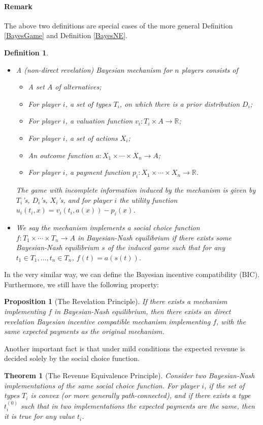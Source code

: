 \documentclass[openany]{book}
\newtheorem{definition}{Definition}[chapter]
\newtheorem{theorem}{Theorem}[chapter]
\newtheorem{proposition}{Proposition}[chapter]
\theoremstyle{remark}
\begin{document}
\paragraph{Remark}
The above two definitions are special cases of the more general Definition \ref{BayesGame} and Definition \ref{BayesNE}.
\begin{definition}$\ $
    \begin{itemize}
        \item A (non-direct revelation) Bayesian mechanism for $n$ players consists of
        \begin{itemize}
            \item A set $A$ of alternatives;
            \item For player $i$, a set of types $T_i$, on which there is a prior distribution $D_i$;
            \item For player $i$, a valuation function $v_i:T_i\times A\to \mathbb{R}$;
            \item For player $i$, a set of actions $X_i$;
            \item An outcome function $a:X_1\times\cdots\times X_n\to A$;
            \item For player $i$, a payment function $p_i:X_1\times\cdots\times X_n\to \mathbb{R}$.
        \end{itemize}
        The game with incomplete information induced by the mechanism is given by $T_i$'s, $D_i$'s, $X_i$'s, and for player $i$ the utility function $u_i(t_i,x)=v_i(t_i,a(x))-p_i(x)$.
        \item We say the mechanism implements a social choice function $f:T_1\times\cdots\times T_n\to A$ in Bayesian-Nash equilibrium if there exists some Bayesian-Nash equilibrium $s$ of the induced game such that for any $t_1\in T_1,\ldots,t_n\in T_n$, $f(t)=a(s(t))$.
    \end{itemize}
\end{definition}

In the very similar way, we can define the Bayesian incentive compatibility (BIC). Furthermore, we still have the following property:
\begin{proposition}[The Revelation Principle]
    If there exists a mechanism implementing $f$ in Bayesian-Nash equilibrium, then there exists an direct revelation Bayesian incentive compatible mechanism implementing $f$, with the same expected payments as the original mechanism.
\end{proposition}

Another important fact is that under mild conditions the expected revenue is decided solely by the social choice function.
\begin{theorem}[The Revenue Equivalence Principle]
    Consider two Bayesian-Nash implementations of the same social choice function. For player $i$, if the set of types $T_i$ is convex (or more generally path-connected), and if there exists a type $t_i^{(0)}$ such that in two implementations the expected payments are the same, then it is true for any value $t_i$.
\end{theorem}
\end{document}
